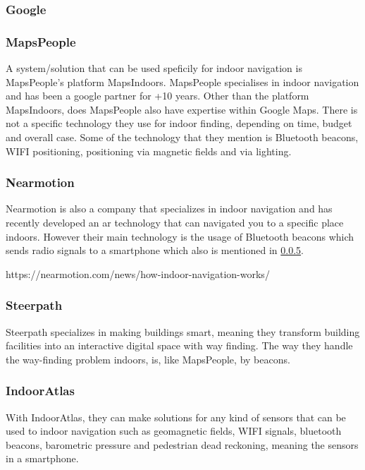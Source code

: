\subsubsection{Google}

\subsubsection{MapsPeople} %
A system/solution that can be used speficily for indoor navigation is MapsPeople's platform MapsIndoors. MapsPeople specialises in indoor navigation and has been a google partner for +10 years. Other than the platform MapsIndoors, does MapsPeople also have expertise within Google Maps. 
There is not a specific technology they use for indoor finding, depending on time, budget and overall case. Some of the technology that they mention is Bluetooth beacons, WIFI positioning, positioning via magnetic fields and via lighting. \cite{mapsppl}

\subsubsection{Nearmotion} %
Nearmotion is also a company that specializes in indoor navigation and has recently developed an \gls{ar} technology that can navigated you to a specific place indoors. However their main technology is the usage of Bluetooth beacons which sends radio signals to a smartphone which also is mentioned in \ref{}. \cite{nearmotion}

https://nearmotion.com/news/how-indoor-navigation-works/

\subsubsection{Steerpath} %
Steerpath specializes in making buildings smart, meaning they transform building facilities into an interactive digital space with way finding. The way they handle the way-finding problem indoors, is, like MapsPeople, by beacons. 

\subsubsection{IndoorAtlas} %
With IndoorAtlas, they can make solutions for any kind of sensors that can be used to indoor navigation such as geomagnetic fields, WIFI signals, bluetooth beacons, barometric pressure and pedestrian dead reckoning, meaning the sensors in a smartphone.


